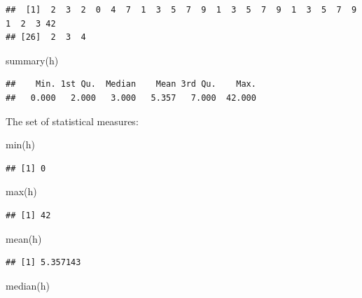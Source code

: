 \documentclass[
]{book}
\newenvironment{Shaded}{\begin{snugshade}}{\end{snugshade}}
\newcommand{\FunctionTok}[1]{\textcolor[rgb]{0.00,0.00,0.00}{#1}}
\newcommand{\NormalTok}[1]{#1}
\theoremstyle{definition}
\theoremstyle{definition}
\theoremstyle{definition}
\theoremstyle{definition}
\theoremstyle{remark}
\begin{document}
\begin{verbatim}
##  [1]  2  3  2  0  4  7  1  3  5  7  9  1  3  5  7  9  1  3  5  7  9  1  2  3 42
## [26]  2  3  4
\end{verbatim}

\begin{Shaded}
\begin{Highlighting}[]
\FunctionTok{summary}\NormalTok{(h)}
\end{Highlighting}
\end{Shaded}

\begin{verbatim}
##    Min. 1st Qu.  Median    Mean 3rd Qu.    Max. 
##   0.000   2.000   3.000   5.357   7.000  42.000
\end{verbatim}

The set of statistical measures:

\begin{Shaded}
\begin{Highlighting}[]
\FunctionTok{min}\NormalTok{(h)}
\end{Highlighting}
\end{Shaded}

\begin{verbatim}
## [1] 0
\end{verbatim}

\begin{Shaded}
\begin{Highlighting}[]
\FunctionTok{max}\NormalTok{(h)}
\end{Highlighting}
\end{Shaded}

\begin{verbatim}
## [1] 42
\end{verbatim}

\begin{Shaded}
\begin{Highlighting}[]
\FunctionTok{mean}\NormalTok{(h)}
\end{Highlighting}
\end{Shaded}

\begin{verbatim}
## [1] 5.357143
\end{verbatim}

\begin{Shaded}
\begin{Highlighting}[]
\FunctionTok{median}\NormalTok{(h)}
\end{Highlighting}
\end{Shaded}
\end{document}
